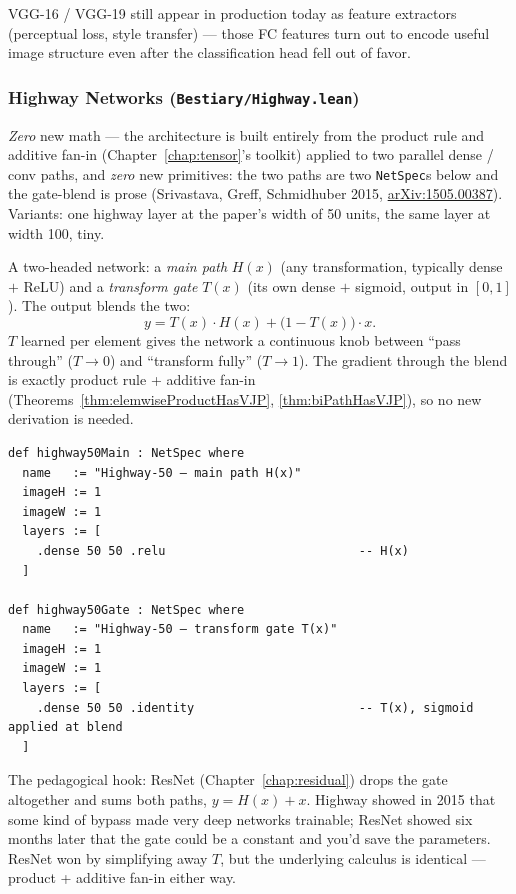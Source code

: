 VGG-16 / VGG-19 still appear in production today as feature
extractors (perceptual loss, style transfer) --- those FC features
turn out to encode useful image structure even after the
classification head fell out of favor.

\subsubsection*{Highway Networks (\texttt{Bestiary/Highway.lean})}
\emph{Zero} new math --- the architecture is built entirely from the
product rule and additive fan-in (Chapter~\ref{chap:tensor}'s
toolkit) applied to two parallel dense / conv paths, and \emph{zero}
new primitives: the two paths are two \texttt{NetSpec}s below and the
gate-blend is prose (Srivastava, Greff, Schmidhuber 2015,
\href{https://arxiv.org/abs/1505.00387}{arXiv:1505.00387}). Variants:
one highway layer at the paper's width of 50 units, the same layer at
width 100, tiny.

A two-headed network: a \emph{main path} $H(x)$ (any transformation,
typically dense $+$ ReLU) and a \emph{transform gate} $T(x)$ (its own
dense $+$ sigmoid, output in $[0, 1]$). The output blends the two:
\[
  y = T(x) \cdot H(x) + \bigl(1 - T(x)\bigr) \cdot x.
\]
$T$ learned per element gives the network a continuous knob between
``pass through'' ($T \to 0$) and ``transform fully'' ($T \to 1$). The
gradient through the blend is exactly product rule + additive
fan-in (Theorems~\ref{thm:elemwiseProductHasVJP}, \ref{thm:biPathHasVJP}),
so no new derivation is needed.

\begin{verbatim}
def highway50Main : NetSpec where
  name   := "Highway-50 — main path H(x)"
  imageH := 1
  imageW := 1
  layers := [
    .dense 50 50 .relu                           -- H(x)
  ]

def highway50Gate : NetSpec where
  name   := "Highway-50 — transform gate T(x)"
  imageH := 1
  imageW := 1
  layers := [
    .dense 50 50 .identity                       -- T(x), sigmoid applied at blend
  ]
\end{verbatim}

The pedagogical hook: ResNet (Chapter~\ref{chap:residual}) drops the
gate altogether and sums both paths, \(y = H(x) + x\). Highway showed in 2015 that
some kind of bypass made very deep networks trainable; ResNet showed
six months later that the gate could be a constant and you'd save the
parameters. ResNet won by simplifying away $T$, but the underlying
calculus is identical --- product + additive fan-in either way.

